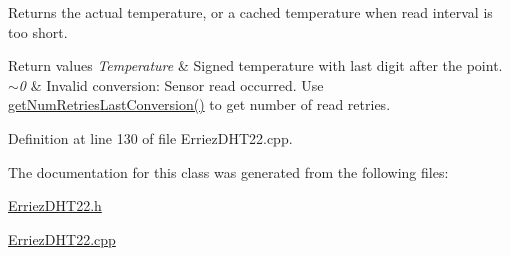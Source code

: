 Returns the actual temperature, or a cached temperature when read interval is too short. 
\begin{DoxyRetVals}{Return values}
{\em Temperature} & Signed temperature with last digit after the point. \\
\hline
{\em $\sim$0} & Invalid conversion\+: Sensor read occurred. Use \hyperlink{class_d_h_t22_a2a6202258c0705df3499b65a74a85067}{get\+Num\+Retries\+Last\+Conversion()} to get number of read retries. \\
\hline
\end{DoxyRetVals}


Definition at line 130 of file Erriez\+D\+H\+T22.\+cpp.



The documentation for this class was generated from the following files\+:\begin{DoxyCompactItemize}
\item 
\hyperlink{_erriez_d_h_t22_8h}{Erriez\+D\+H\+T22.\+h}\item 
\hyperlink{_erriez_d_h_t22_8cpp}{Erriez\+D\+H\+T22.\+cpp}\end{DoxyCompactItemize}
